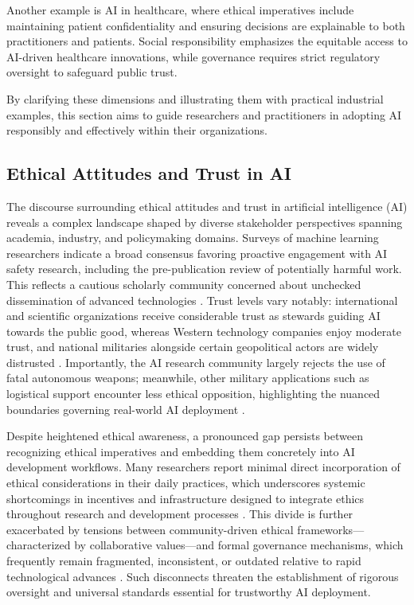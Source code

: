 \documentclass[sigconf]{acmart}
\begin{document}
Another example is AI in healthcare, where ethical imperatives include maintaining patient confidentiality and ensuring decisions are explainable to both practitioners and patients. Social responsibility emphasizes the equitable access to AI-driven healthcare innovations, while governance requires strict regulatory oversight to safeguard public trust.

By clarifying these dimensions and illustrating them with practical industrial examples, this section aims to guide researchers and practitioners in adopting AI responsibly and effectively within their organizations.

\subsection{Ethical Attitudes and Trust in AI}

The discourse surrounding ethical attitudes and trust in artificial intelligence (AI) reveals a complex landscape shaped by diverse stakeholder perspectives spanning academia, industry, and policymaking domains. Surveys of machine learning researchers indicate a broad consensus favoring proactive engagement with AI safety research, including the pre-publication review of potentially harmful work. This reflects a cautious scholarly community concerned about unchecked dissemination of advanced technologies \cite{ref9}. Trust levels vary notably: international and scientific organizations receive considerable trust as stewards guiding AI towards the public good, whereas Western technology companies enjoy moderate trust, and national militaries alongside certain geopolitical actors are widely distrusted \cite{ref9,ref25}. Importantly, the AI research community largely rejects the use of fatal autonomous weapons; meanwhile, other military applications such as logistical support encounter less ethical opposition, highlighting the nuanced boundaries governing real-world AI deployment \cite{ref9,ref25}.

Despite heightened ethical awareness, a pronounced gap persists between recognizing ethical imperatives and embedding them concretely into AI development workflows. Many researchers report minimal direct incorporation of ethical considerations in their daily practices, which underscores systemic shortcomings in incentives and infrastructure designed to integrate ethics throughout research and development processes \cite{ref9,ref25}. This divide is further exacerbated by tensions between community-driven ethical frameworks—characterized by collaborative values—and formal governance mechanisms, which frequently remain fragmented, inconsistent, or outdated relative to rapid technological advances \cite{ref25,ref36}. Such disconnects threaten the establishment of rigorous oversight and universal standards essential for trustworthy AI deployment.
\end{document}
